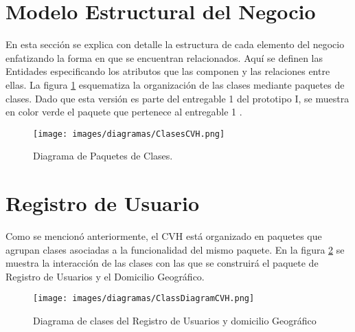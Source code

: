 \section{Modelo Estructural del Negocio} 


	En esta sección se explica con detalle la estructura de cada elemento del negocio enfatizando la forma en que se encuentran relacionados.
	Aquí se definen las Entidades especificando los atributos que las componen y  las relaciones entre ellas. La figura \ref{fig:clases} esquematiza la organización de las clases mediante paquetes de clases. Dado que esta versión es parte del entregable 1 del prototipo I, se muestra en color verde el paquete que pertenece al entregable 1 .\\

\begin{figure}[htbp]
  \begin{center}
    \texttt{[image: images/diagramas/ClasesCVH.png]}
    \caption{Diagrama de Paquetes de Clases.}
    \label{fig:clases}
  \end{center}
\end{figure}

\newpage
\section{Registro de Usuario} 

	Como se mencionó anteriormente, el CVH está organizado en paquetes que agrupan clases asociadas a la funcionalidad del mismo paquete. En la figura \ref{clases-registroUsuarios} se muestra la interacción de las clases con las que se construirá el paquete de Registro de Usuarios y el Domicilio Geográfico.

\begin{figure}[htbp]
  \begin{center}
    \texttt{[image: images/diagramas/ClassDiagramCVH.png]}
    \caption{Diagrama de clases del Registro de Usuarios y domicilio Geográfico}
    \label{clases-registroUsuarios}
  \end{center}
\end{figure}





